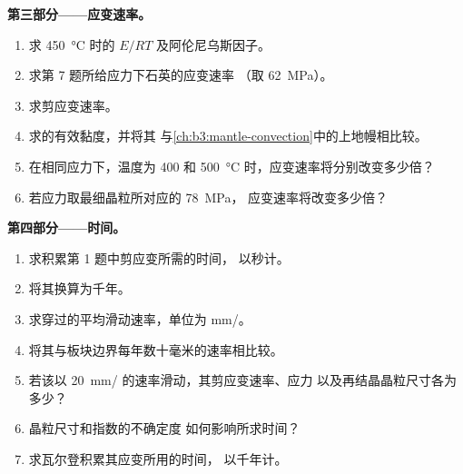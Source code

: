 \begin{problem}
\medskip\noindent\textbf{第三部分——应变速率。}
\begin{enumerate}[resume]
  \item 求 \qty{450}{\celsius} 时的 $E/RT$ 及阿伦尼乌斯因子。
  \item 求第 7 题所给应力下石英的应变速率
        （取 \qty{62}{MPa}）。
  \item 求剪应变速率。
  \item 求的有效黏度，并将其
        与\cref{ch:b3:mantle-convection}中的上地幔相比较。
  \item 在相同应力下，温度为 400 和
        \qty{500}{\celsius} 时，应变速率将分别改变多少倍？
  \item 若应力取最细晶粒所对应的 \qty{78}{MPa}，
        应变速率将改变多少倍？
\end{enumerate}

\medskip\noindent\textbf{第四部分——时间。}
\begin{enumerate}[resume]
  \item 求积累第 1 题中剪应变所需的时间，
        以秒计。
  \item 将其换算为千年。
  \item 求穿过的平均滑动速率，单位为 \unit{mm/}。
  \item 将其与板块边界每年数十毫米的速率相比较。
  \item 若该以 \qty{20}{mm/} 的速率滑动，其剪应变速率、应力
        以及再结晶晶粒尺寸各为多少？
  \item 晶粒尺寸和指数的不确定度
        如何影响所求时间？
  \item 求瓦尔登积累其应变所用的时间，
        以千年计。
\end{enumerate}
\end{problem}
